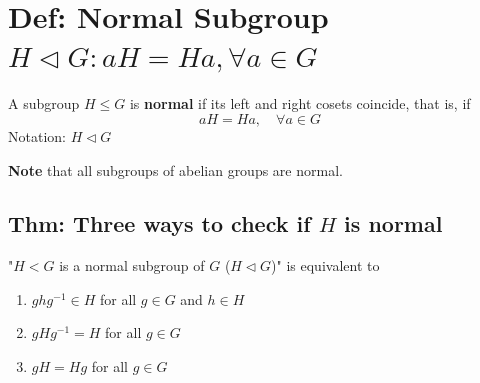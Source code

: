 \documentclass[11pt]{elegantbook}
\begin{document}
\section{Def: Normal Subgroup $H\lhd G: aH=Ha,\forall a\in G$}
\begin{definition}
    A subgroup $H\leq G$ is \textbf{normal} if its left and right cosets coincide, that is, if $$aH=Ha,\quad \forall a\in G$$
    Notation: $H \lhd G$
\end{definition}
\textbf{Note} that all subgroups of abelian groups are normal.


\subsection{Thm: Three ways to check if $H$ is normal}
\begin{theorem}
    "$H<G$ is a normal subgroup of $G$ ($H\lhd G$)" is equivalent to
    \begin{enumerate}[(1)]
        \item $ghg^{-1}\in H$ for all $g\in G$ and $h\in H$
        \item $gHg^{-1}=H$ for all $g\in G$
        \item $gH=Hg$ for all $g\in G$
    \end{enumerate}
\end{theorem}
\end{document}
